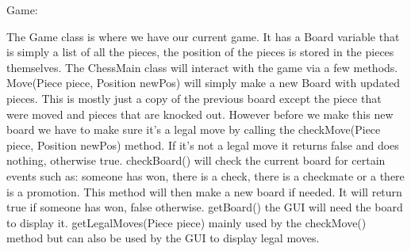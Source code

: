 \documentclass{article}
\begin{document}
        \noindent
        Game:\\
        \begin{outline}
            The Game class is where we have our current game. It has a Board 
            variable that is simply a list of all the pieces, the position
            of the pieces is stored in the pieces themselves. The ChessMain class
            will interact with the game via a few methods.
            \1 Move(Piece piece, Position newPos) will simply make a new Board 
            with updated pieces. This is mostly just a copy of the previous board
            except the piece that were moved and pieces that are knocked out.
            However before we make this new board we have to make sure it’s a
            legal move by calling the checkMove(Piece piece, Position newPos)
            method. If it’s not a legal move it returns false and does nothing,
            otherwise true.
            \1 checkBoard() will check the current board for certain events 
            such as: someone has won, there is a check, there is a checkmate or 
            a there is a promotion. This method will then make a new board if 
            needed. It will return true if someone has won, false otherwise.
            \1 getBoard() the GUI will need the board to display it.
            \1 getLegalMoves(Piece piece) mainly used by the checkMove() method
            but can also be used by the GUI to display legal moves.
        \end{outline}

    
\end{document}
